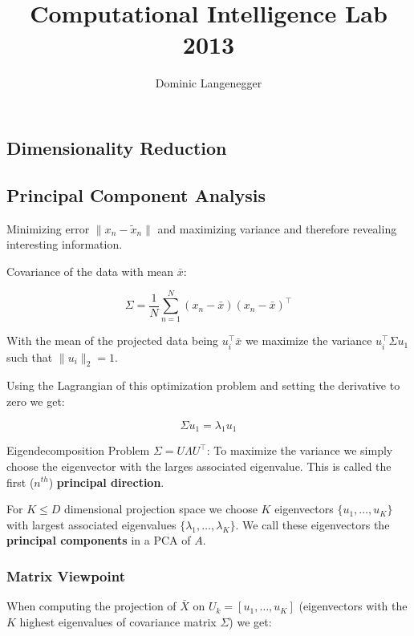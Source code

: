 \documentclass[a4paper,landscape,10pt]{article}
\title{Computational Intelligence Lab 2013}
\author{Dominic Langenegger}
\begin{document}
\begin{multicols}{4}

\abovedisplayskip=0pt
\belowdisplayskip=5pt
\abovedisplayshortskip=0pt
\belowdisplayshortskip=5pt




\section{Dimensionality Reduction}
\subsection{Principal Component Analysis}
Minimizing error $\|x_n - \tilde{x}_n\|$ and maximizing
variance and therefore revealing interesting information.

Covariance of the data with mean $\bar{x}$:

\[
    \Sigma = \frac{1}{N} \sum_{n=1}^N (x_n - \bar{x}) (x_n - \bar{x})^\top
\]

With the mean of the projected data being $u_i^\top \bar{x}$ we maximize
the variance $u_i^\top \Sigma u_1$ such that $\|u_i\|_2 = 1$.

Using the Lagrangian of this optimization problem and setting the derivative to
zero we get:

\[
    \Sigma u_1 = \lambda_1 u_1
\]

Eigendecomposition Problem $\Sigma = U \Lambda U^\top$: To maximize the variance
we simply choose the eigenvector with the larges associated eigenvalue. This is
called the first ($n^{th}$) {\bf principal direction}.

For $K \leq D$ dimensional projection space we choose $K$ eigenvectors $\{u_1,
\ldots, u_K\}$ with largest associated eigenvalues $\{\lambda_1, \ldots,
\lambda_K\}$. We call these eigenvectors the {\bf principal components} in a PCA
of $A$.

\subsubsection{Matrix Viewpoint}

When computing the projection of $\bar{X}$ on $U_k = [u_1, \ldots, u_K]$
(eigenvectors with the $K$ highest eigenvalues of covariance matrix $\Sigma$)
we get:


\end{multicols}
\end{document}
